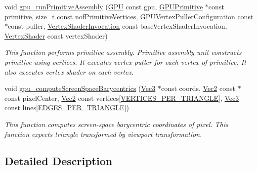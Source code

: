 \begin{DoxyCompactItemize}
void \hyperlink{group__gpu__side_ga5eb10381738a5e0426b2811820bc9483}{gpu\-\_\-run\-Primitive\-Assembly} (\hyperlink{fwd_8h_a06964ec111fe28721d8618b6d0d993bf}{G\-P\-U} const gpu, \hyperlink{structGPUPrimitive}{G\-P\-U\-Primitive} $\ast$const primitive, size\-\_\-t const nof\-Primitive\-Vertices, \hyperlink{structGPUVertexPullerConfiguration}{G\-P\-U\-Vertex\-Puller\-Configuration} const $\ast$const puller, \hyperlink{fwd_8h_a3a23f024b4270ea7139910001f477346}{Vertex\-Shader\-Invocation} const base\-Vertex\-Shader\-Invocation, \hyperlink{fwd_8h_a497a7e30f7c9f768e811e535773375bf}{Vertex\-Shader} const vertex\-Shader)
\begin{DoxyCompactList}\small\item\em This function performs primitive assembly. Primitive assembly unit constructs primitive using vertices. It executes vertex puller for each vertex of primitive. It also executes vertex shader on each vertex. \end{DoxyCompactList}\item 
void \hyperlink{group__gpu__side_gad1769dca11910a684a6ddaad188f3e3d}{gpu\-\_\-compute\-Screen\-Space\-Barycentrics} (\hyperlink{structVec3}{Vec3} $\ast$const coords, \hyperlink{structVec2}{Vec2} const $\ast$const pixel\-Center, \hyperlink{structVec2}{Vec2} const vertices\mbox{[}\hyperlink{fwd_8h_a67df0e09b776eea53360bcc8f4a82ac9}{V\-E\-R\-T\-I\-C\-E\-S\-\_\-\-P\-E\-R\-\_\-\-T\-R\-I\-A\-N\-G\-L\-E}\mbox{]}, \hyperlink{structVec3}{Vec3} const lines\mbox{[}\hyperlink{fwd_8h_a9f5bff3a2ab411701ed6262d5eb96c39}{E\-D\-G\-E\-S\-\_\-\-P\-E\-R\-\_\-\-T\-R\-I\-A\-N\-G\-L\-E}\mbox{]})
\begin{DoxyCompactList}\small\item\em This function computes screen-\/space barycentric coordinates of pixel. This function expects triangle transformed by viewport transformation. \end{DoxyCompactList}\end{DoxyCompactItemize}


\subsection{Detailed Description}


